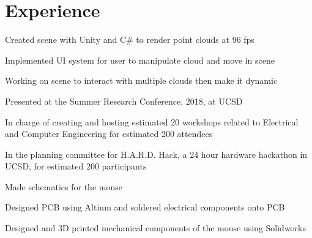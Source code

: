\documentclass[]{deedy-resume-openfont}
\begin{document}
\begin{minipage}[t]{0.66\textwidth} 


\section{Experience}

\sectionsep
\begin{tightemize}
\item Created scene with Unity and C\# to render point clouds at 96 fps
\item Implemented UI system for user to manipulate cloud and move in scene
\item Working on scene to interact with multiple clouds then make it dynamic
\item Presented at the Summer Research Conference, 2018, at UCSD
\end{tightemize}
\sectionsep

\begin{tightemize}
\item In charge of creating and hosting estimated 20 workshops related to Electrical and Computer Engineering for estimated 200 attendees
\item In the planning committee for H.A.R.D. Hack, a 24 hour hardware hackathon in UCSD, for estimated 200 participants
\end{tightemize}
\sectionsep


\begin{tightemize}
\item Made schematics for the mouse
\item Designed PCB using Altium and soldered electrical components onto PCB
\item Designed and 3D printed mechanical components of the mouse using Solidworks
\end{tightemize}
\sectionsep


\end{minipage}
\end{document}

